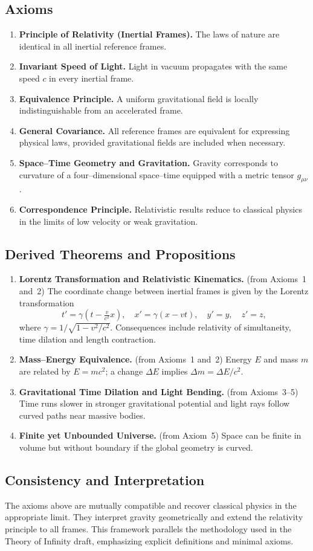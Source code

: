 \documentclass[11pt]{article}
\begin{document}
\subsection*{Axioms}
\begin{enumerate}
  \item \textbf{Principle of Relativity (Inertial Frames).} The laws of nature are identical in all inertial reference frames.
  \item \textbf{Invariant Speed of Light.} Light in vacuum propagates with the same speed $c$ in every inertial frame.
  \item \textbf{Equivalence Principle.} A uniform gravitational field is locally indistinguishable from an accelerated frame.
  \item \textbf{General Covariance.} All reference frames are equivalent for expressing physical laws, provided gravitational fields are included when necessary.
  \item \textbf{Space--Time Geometry and Gravitation.} Gravity corresponds to curvature of a four--dimensional space--time equipped with a metric tensor $g_{\mu\nu}$.
  \item \textbf{Correspondence Principle.} Relativistic results reduce to classical physics in the limits of low velocity or weak gravitation.
\end{enumerate}

\subsection*{Derived Theorems and Propositions}
\begin{enumerate}
  \item \textbf{Lorentz Transformation and Relativistic Kinematics.} (from Axioms~1 and~2) The coordinate change between inertial frames is given by the Lorentz transformation
  \[t' = \gamma(t-\tfrac{v}{c^2}x),\quad x' = \gamma(x-vt),\quad y'=y,\quad z'=z,\]
  where $\gamma=1/\sqrt{1-v^2/c^2}$. Consequences include relativity of simultaneity, time dilation and length contraction.
  \item \textbf{Mass--Energy Equivalence.} (from Axioms~1 and~2) Energy $E$ and mass $m$ are related by $E=mc^2$; a change $\Delta E$ implies $\Delta m=\Delta E/c^2$.
  \item \textbf{Gravitational Time Dilation and Light Bending.} (from Axioms~3--5) Time runs slower in stronger gravitational potential and light rays follow curved paths near massive bodies.
  \item \textbf{Finite yet Unbounded Universe.} (from Axiom~5) Space can be finite in volume but without boundary if the global geometry is curved.
\end{enumerate}

\subsection*{Consistency and Interpretation}
The axioms above are mutually compatible and recover classical physics in the appropriate limit. They interpret gravity geometrically and extend the relativity principle to all frames. This framework parallels the methodology used in the Theory of Infinity draft, emphasizing explicit definitions and minimal axioms.
\end{document}
